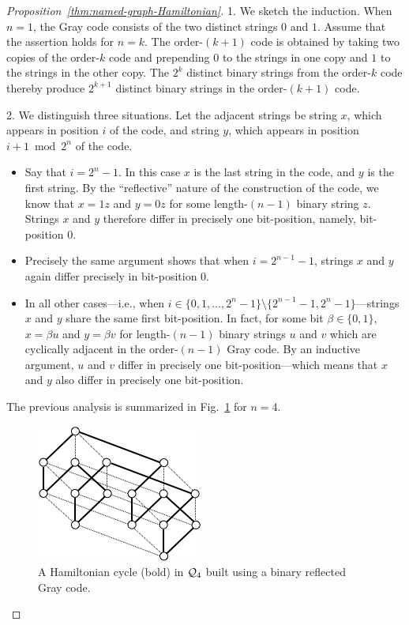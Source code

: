 \begin{proof}[Proposition~\ref{thm:named-graph-Hamiltonian}]
 1.
We sketch the induction.  When $n=1$, the Gray code consists of
the two distinct strings $0$ and $1$.  Assume that the assertion holds
for $n=k$.  The order-$(k+1)$ code is obtained by taking two copies of
the order-$k$ code and prepending $0$ to the strings in one copy and
$1$ to the strings in the other copy.  The $2^k$ distinct binary
strings from the order-$k$ code thereby produce $2^{k+1}$ distinct
binary strings in the order-$(k+1)$ code.

\medskip

 2.
We distinguish three situations.  Let the adjacent strings be string $x$, which appears in 
position $i$ of the code, and string $y$, which appears in position $i+1 \bmod 2^n$ of the code.
  \begin{itemize}
  \item
Say that $i = 2^n-1$.  In this case $x$ is the last string in the
code, and $y$ is the first string.  By the ``reflective'' nature of the
construction of the code, we know that $x = 1z$ and $y = 0z$ for some
length-$(n-1)$ binary string $z$.  Strings $x$ and $y$ therefore
differ in precisely one bit-position, namely, bit-position $0$.

  \item
Precisely the same argument shows that when $i = 2^{n-1} -1$, strings
$x$ and $y$ again differ precisely in bit-position $0$.

  \item
In all other cases---i.e., when $i \in \{0,1, \ldots, 2^n-1\} \setminus \{2^{n-1} -1, 2^n-1\}$---strings 
$x$ and $y$ share the same first bit-position.  In fact, for some bit $\beta \in \{0,1\}$, 
$x = \beta u$ and $y = \beta v$ for length-$(n-1)$ binary strings $u$ and $v$ which are 
cyclically adjacent in the order-$(n-1)$ Gray code.  By an inductive argument, $u$ and $v$ 
differ in precisely one bit-position---which means that $x$ and $y$ also differ in precisely one bit-position.
  \end{itemize}
The previous analysis is summarized in Fig.~\ref{fig:HamiltonHypercude} for $n=4$.
  \begin{figure}[hbt]
\begin{center}
       \includegraphics[scale=0.6]{FiguresGraph/HamiltonHypercube}
       \caption{A Hamiltonian cycle (bold) in $\mbox{$\cal Q$}_4$ built using a
       binary reflected Gray code.}
  \label{fig:HamiltonHypercude}
\end{center}
\end{figure}


\end{proof}
